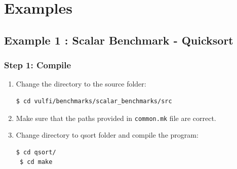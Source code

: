 \documentclass[12pt,a4paper]{article}
\begin{document}

 
 
\section{Examples}
\label{examples}
\subsection{Example 1 : Scalar Benchmark - Quicksort }
\label{ex1-qsort}

\subsubsection{Step 1: Compile}
\begin{enumerate}
%
%
\item Change the directory to the source folder:
 \begin{Verbatim}[fontsize=\relsize{-1},frame=single,framerule=0.1mm]
 $ cd vulfi/benchmarks/scalar_benchmarks/src
 \end{Verbatim}
 \item Make sure that the paths provided in \texttt{common.mk} file
 are correct. 
 \item Change directory to qsort folder and compile the program:
 \begin{Verbatim}[fontsize=\relsize{-1},frame=single,framerule=0.1mm]
 $ cd qsort/
 $ cd make
 \end{Verbatim}
 \end{enumerate}
\end{document}
